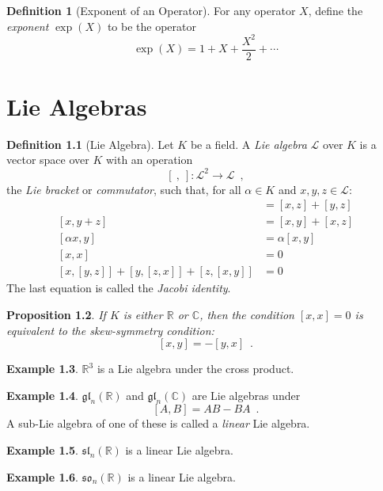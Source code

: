 \documentclass{book}
\newtheorem{prop}{Proposition}[chapter]
\theoremstyle{definition}
\newtheorem{df}[prop]{Definition}
\newtheorem{ex}[prop]{Example}
\newcommand{\gl}[2]{\ensuremath{\mathfrak{gl}_{#1} \left( {#2} \right)}}
\renewcommand{\sl}[2]{\ensuremath{\mathfrak{sl}_{#1} \left( {#2} \right)}}
\newcommand{\so}[2]{\ensuremath{\mathfrak{so}_{#1} \left( {#2} \right)}}
\begin{document}
\begin{df}[Exponent of an Operator]
For any operator $X$, define the \emph{exponent} $\exp(X)$ to be the operator
\[ \exp(X) = 1 + X + \frac{X^2}{2} + \cdots \]
\end{df}

\chapter{Lie Algebras}

\begin{df}[Lie Algebra]
Let $K$ be a field. A \emph{Lie algebra} $\mathcal{L}$ over $K$ is a vector space over $K$ with an operation
\[ [\ ,\ ] : \mathcal{L}^2 \rightarrow \mathcal{L} \enspace , \]
the \emph{Lie bracket} or \emph{commutator}, such that, for all $\alpha \in K$ and $x,y,z \in \mathcal{L}$:
\begin{align*}
[x+y,z] & = [x,z] + [y,z] \\
[x,y+z] & = [x,y] + [x,z] \\
[\alpha x,y] & = \alpha [x,y] \\
[x,x] & = 0 \\
[x,[y,z]] + [y,[z,x]] + [z,[x,y]] & = 0
\end{align*}
The last equation is called the \emph{Jacobi identity}.
\end{df}

\begin{prop}
If $K$ is either $\mathbb{R}$ or $\mathbb{C}$, then the condition $[x,x] = 0$ is equivalent to the \emph{skew-symmetry condition}:
\[ [x,y] = -[y,x] \enspace . \]
\end{prop}


\begin{ex}
$\mathbb{R}^3$ is a Lie algebra under the cross product.
\end{ex}

\begin{ex}
$\gl
{n}{\mathbb{R}}$ and $\gl{n}{\mathbb{C}}$ are Lie algebras under
\[ [A,B] = AB - BA \enspace . \]
A sub-Lie algebra of one of these is called a \emph{linear} Lie algebra.
\end{ex}

\begin{ex}
$\sl{n}{\mathbb{R}}$ is a linear Lie algebra.
\end{ex}

\begin{ex}
$\so{n}{\mathbb{R}}$ is a linear Lie algebra.
\end{ex}
\end{document}
